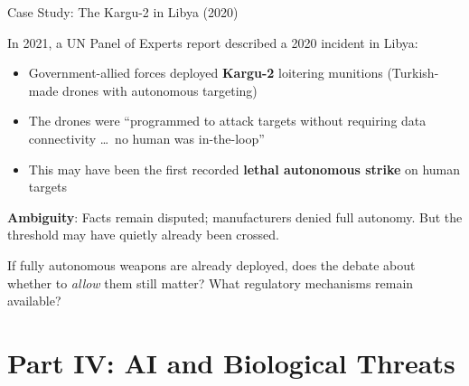 \documentclass[aspectratio=169,11pt]{beamer}
\begin{document}
\begin{frame}[shrink=20]{Case Study: The Kargu-2 in Libya (2020)}
\begin{casestudybox}
\small
In 2021, a UN Panel of Experts report described a 2020 incident in Libya:
\begin{itemize}
    \item Government-allied forces deployed \textbf{Kargu-2} loitering munitions (Turkish-made drones with autonomous targeting)
    \item The drones were ``programmed to attack targets without requiring data connectivity \ldots\ no human was in-the-loop''
    \item This may have been the first recorded \textbf{lethal autonomous strike} on human targets
\end{itemize}
\textbf{Ambiguity}: Facts remain disputed; manufacturers denied full autonomy. But the threshold may have quietly already been crossed.
\end{casestudybox}
\begin{discussionbox}[Discussion]
\scriptsize
If fully autonomous weapons are already deployed, does the debate about whether to \emph{allow} them still matter? What regulatory mechanisms remain available?
\end{discussionbox}
\end{frame}

\section{Part IV: AI and Biological Threats}
\end{document}
